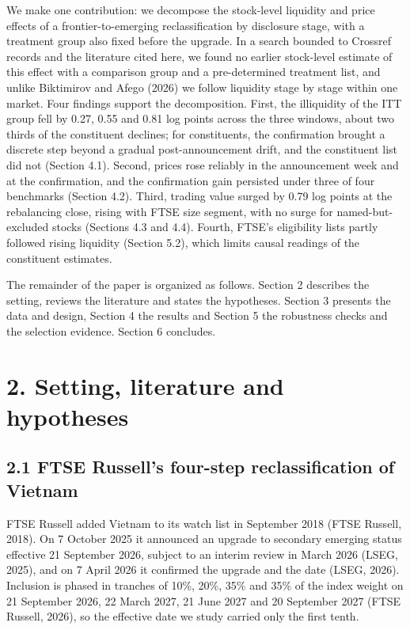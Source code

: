 \documentclass[review,authoryear,12pt]{elsarticle}
\begin{document}
We make one contribution: we decompose the stock-level liquidity and
price effects of a frontier-to-emerging reclassification by disclosure
stage, with a treatment group also fixed before the upgrade. In a search
bounded to Crossref records and the literature cited here, we found no
earlier stock-level estimate of this effect with a comparison group and
a pre-determined treatment list, and unlike Biktimirov and Afego (2026)
we follow liquidity stage by stage within one market. Four findings
support the decomposition. First, the illiquidity of the ITT group fell
by 0.27, 0.55 and 0.81 log points across the three windows, about two
thirds of the constituent declines; for constituents, the confirmation
brought a discrete step beyond a gradual post-announcement drift, and
the constituent list did not (Section 4.1). Second, prices rose reliably
in the announcement week and at the confirmation, and the confirmation
gain persisted under three of four benchmarks (Section 4.2). Third,
trading value surged by 0.79 log points at the rebalancing close, rising
with FTSE size segment, with no surge for named-but-excluded stocks
(Sections 4.3 and 4.4). Fourth, FTSE's eligibility lists partly followed
rising liquidity (Section 5.2), which limits causal readings of the
constituent estimates.

The remainder of the paper is organized as follows. Section 2 describes
the setting, reviews the literature and states the hypotheses. Section 3
presents the data and design, Section 4 the results and Section 5 the
robustness checks and the selection evidence. Section 6 concludes.

\hypertarget{setting-literature-and-hypotheses}{%
\section*{2. Setting, literature and
hypotheses}}

\hypertarget{ftse-russells-four-step-reclassification-of-vietnam}{%
\subsection*{2.1 FTSE Russell's four-step reclassification of
Vietnam}}

FTSE Russell added Vietnam to its watch list in September 2018 (FTSE
Russell, 2018). On 7 October 2025 it announced an upgrade to secondary
emerging status effective 21 September 2026, subject to an interim
review in March 2026 (LSEG, 2025), and on 7 April 2026 it confirmed the
upgrade and the date (LSEG, 2026). Inclusion is phased in tranches of
10\%, 20\%, 35\% and 35\% of the index weight on 21 September 2026, 22
March 2027, 21 June 2027 and 20 September 2027 (FTSE Russell, 2026), so
the effective date we study carried only the first tenth.
\end{document}
